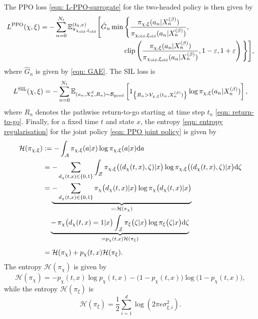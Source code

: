 The PPO loss \eqref{eqn: L-PPO-surrogate} for the two-headed policy is then given by
\begin{align}
    L^{\text{PPO}}(\chi, \xi) = -\sum_{n=0}^{N_t} \mathbb{E}^{(t_0,x)}_{\pi_{\chi_\text{old}, \xi_\text{old}}} \Bigg[ \hat G_n &\min \Bigg\{ \frac{\pi_{\chi, \xi}(a_n | X^{(\beta)}_n)}{\pi_{\chi_\text{old}, \xi_\text{old}}(a_n |X^{(\beta)}_n)}, \nonumber \\
    & \qquad \text{clip}\left( \frac{\pi_{\chi, \xi}(a_n | X^{(\beta)}_n)}{\pi_{\chi_\text{old}, \xi_\text{old}}(a_n |X^{(\beta)}_n)}, 1-\varepsilon, 1+\varepsilon \right)\Bigg\} \Bigg],
    \label{eqn: L-PPO-surrogate with 2 heads}
\end{align}
where $\hat G_n$ is given by \eqref{eqn: GAE}. The SIL loss is 
\begin{equation}
    L^{\text{SIL}}(\chi, \xi) = -\sum_{n=0}^{N_t}\mathbb{E}_{(a_n, X^{\beta}_n, R_n) \sim \mathcal{B}_{\text{good}}} \left[ 1_{\left\{R_n > V_{\chi, \xi}(t_n,X^{(\beta)}_n)\right\}} \log \pi_{\chi, \xi}(a_n | X^{(\beta)}_n) \right],
    \label{eqn: L-SIL with 2 heads}
\end{equation}
where $R_n$ denotes the pathwise return-to-go starting at time step $t_n$ \eqref{eqn: return-to-go}.  Finally, for a fixed time $t$ and state $x$, the entropy \eqref{eqn: entropy regularisation} for the joint policy \eqref{eqn: PPO joint policy} is given by
\begin{align}
    \mathcal{H}(\pi_{\chi, \xi}) &:= - \int_\mathcal{A} \pi_{\chi, \xi}(a|x) \log \pi_{\chi, \xi}(a|x) \mathrm{d} a \nonumber \\
    &= - \sum_{d_\chi(t,x)\in \{0,1\}} \int_\mathcal{Z} \pi_{\chi, \xi}\big((d_\chi(t,x), \zeta) | x\big) \log \pi_{\chi, \xi}\big((d_\chi(t,x), \zeta) | x\big) \mathrm{d} \zeta \nonumber \\
    &= \underbrace{- \sum_{d_\chi(t,x) \in \{0,1\}} \pi_\chi\big(d_\chi(t,x) | x\big) \log\pi_\chi\big(d_\chi(t,x) | x\big) }_{=: \mathcal{H}(\pi_\chi)} \nonumber \\ 
    & \quad \underbrace{ - \,\pi_\chi \big(d_\chi(t,x) = 1 | x\big) \int_\mathcal{Z} \pi_\xi\big( \zeta| x\big) \log \pi_\xi\big( \zeta| x\big) \mathrm{d} \zeta}_{= p_\chi(t,x) \mathcal{H}(\pi_\xi)} \nonumber \\[0.5em]
    &= \mathcal{H}(\pi_\chi) + p_\chi(t,x) \mathcal{H}(\pi_\xi).
    \label{eqn: L-entropy with 2 heads} 
\end{align}
The entropy $\mathcal{H}(\pi_\chi)$ is given by 
\begin{equation*}
    \mathcal{H}(\pi_\chi) = - p_\chi(t,x) \log p_\chi(t,x) - \big(1-p_\chi(t,x)\big)\log \big(1-p_\chi(t,x)\big),
\end{equation*}
while the entropy $\mathcal{H}(\pi_\xi)$ is
\begin{equation*}
    \mathcal{H}(\pi_\xi) = \frac{1}{2} \sum_{i=1}^d \log(2 \pi e \sigma_{\xi,i}^2).
\end{equation*}

